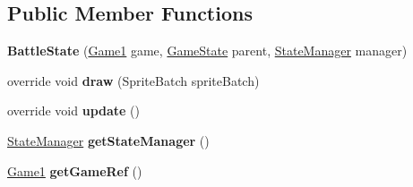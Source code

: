 \subsection*{Public Member Functions}
\begin{DoxyCompactItemize}
\item 
\hypertarget{class_simple_r_p_g_1_1_states_1_1_battle_state_a6f6ee41b383c1e50137ad9e3fbbdfcbe}{{\bfseries Battle\-State} (\hyperlink{class_simple_r_p_g_1_1_game1}{Game1} game, \hyperlink{class_simple_r_p_g_1_1_states_1_1_game_state}{Game\-State} parent, \hyperlink{class_simple_r_p_g_1_1_states_1_1_state_manager}{State\-Manager} manager)}\label{class_simple_r_p_g_1_1_states_1_1_battle_state_a6f6ee41b383c1e50137ad9e3fbbdfcbe}

\item 
\hypertarget{class_simple_r_p_g_1_1_states_1_1_battle_state_aea4acbb5ef3605fa73f59840d3f64d85}{override void {\bfseries draw} (Sprite\-Batch sprite\-Batch)}\label{class_simple_r_p_g_1_1_states_1_1_battle_state_aea4acbb5ef3605fa73f59840d3f64d85}

\item 
\hypertarget{class_simple_r_p_g_1_1_states_1_1_battle_state_ab34b5df3fa137fb63111568eb9fd6382}{override void {\bfseries update} ()}\label{class_simple_r_p_g_1_1_states_1_1_battle_state_ab34b5df3fa137fb63111568eb9fd6382}

\item 
\hypertarget{class_simple_r_p_g_1_1_states_1_1_battle_state_a71de4d97035523217f827c4dbbedb36e}{\hyperlink{class_simple_r_p_g_1_1_states_1_1_state_manager}{State\-Manager} {\bfseries get\-State\-Manager} ()}\label{class_simple_r_p_g_1_1_states_1_1_battle_state_a71de4d97035523217f827c4dbbedb36e}

\item 
\hypertarget{class_simple_r_p_g_1_1_states_1_1_battle_state_a219ad99cffee902574176cb9e88b0831}{\hyperlink{class_simple_r_p_g_1_1_game1}{Game1} {\bfseries get\-Game\-Ref} ()}\label{class_simple_r_p_g_1_1_states_1_1_battle_state_a219ad99cffee902574176cb9e88b0831}


\end{DoxyCompactItemize}
